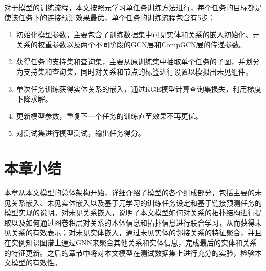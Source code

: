 对于模型的训练流程，本文按照元学习单任务训练方法进行，每个任务的目标都是使该任务下的连接预测效果最优，单个任务的训练流程包含有5步：

\begin{enumerate}[label=\arabic*)]
  \item 初始化模型参数，主要包含了训练数据集中可见实体和关系的嵌入初始化、元关系的权重参数以及两个不同阶段的GCN层和CompGCN层的传递参数。
  \item 获得任务的支持集和查询集，主要从原训练集中抽取单个任务的子图，并划分为支持集和查询集，同时对关系和节点的标签进行设置以模拟出未见组件。
  \item 单次任务训练获得实体关系的嵌入，通过KGE模型计算查询集损失，利用梯度下降求解。
  \item 更新模型参数，重复下一个任务的训练直至效果不再更优。
  \item 对测试集进行模型测试，输出任务得分。
\end{enumerate}

\section{本章小结}
本章从本文模型的总体架构开始，详细介绍了模型的各个组成部分，包括主要的未见关系嵌入、未见实体嵌入以及基于元学习的训练任务设定和基于链接预测任务的模型实现的说明。对未见关系嵌入，说明了本文模型如何对关系的拓扑结构进行提取以及如何通过图卷积层对关系的本体信息和拓扑信息进行联合学习，从而获得未见关系的有效表示；对未见实体嵌入，通过未见实体的邻接关系的特征聚合，并且在实例知识图谱上通过GNN来聚合其他关系和实体信息，完成最后的实体和关系的特征更新。之后的章节中将对本文模型在测试数据集上进行充分的实验，检验本文模型的有效性。